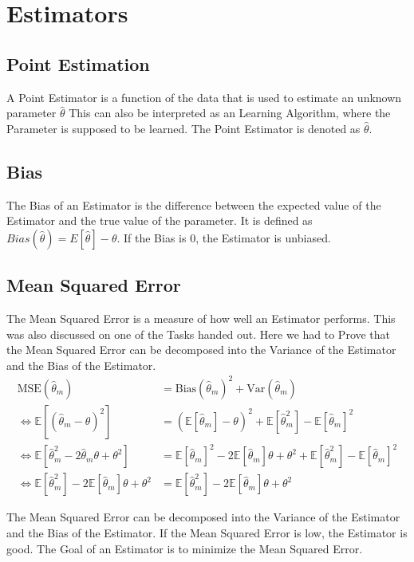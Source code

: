 \documentclass[a4paper]{article}
\newcommand{\E}{\mathbb{E}}
\newcommand{\hatt}{\hat{\theta}_m}
\begin{document}
\section{Estimators}
\subsection{Point Estimation}

A Point Estimator is a function of the data that is used to estimate an unknown parameter $\hat{\theta}$ This can also be interpreted as an Learning Algorithm, where the Parameter is supposed to be learned. The Point Estimator is denoted as $\hat{\theta}$. 

\subsection{Bias}

The Bias of an Estimator is the difference between the expected value of the Estimator and the true value of the parameter. It is defined as $Bias(\hat{\theta}) = E[\hat{\theta}] - \theta$. If the Bias is 0, the Estimator is unbiased.

\subsection{Mean Squared Error}

The Mean Squared Error is a measure of how well an Estimator performs. This was also discussed on one of the Tasks handed out. Here we had to Prove that the Mean Squared Error can be decomposed into the Variance of the Estimator and the Bias of the Estimator. 
\begin{align*}
    \text{MSE}(\hatt) &= \text{Bias}(\hatt)^2 + \text{Var}(\hatt) \\
    \Leftrightarrow \E[(\hatt - \theta)^2] &= (\E[\hatt] - \theta)^2 + \E[\hatt^2] - \E[\hatt]^2 \\
    \Leftrightarrow \E[\hatt^2 - 2\hatt\theta + \theta^2] &= \E[\hatt]^2 - 2\E[\hatt]\theta + \theta^2 + \E[\hatt^2] - \E[\hatt]^2 \\
    \Leftrightarrow \E[\hatt^2] - 2\E[\hatt]\theta + \theta^2 &= \E[\hatt^2] - 2\E[\hatt]\theta + \theta^2
\end{align*}


The Mean Squared Error can be decomposed into the Variance of the Estimator and the Bias of the Estimator. If the Mean Squared Error is low, the Estimator is good. The Goal of an Estimator is to minimize the Mean Squared Error.
\end{document}

